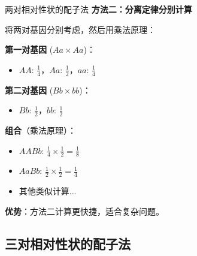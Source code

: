 \documentclass[a4paper,11pt]{ctexart}
\begin{document}
\begin{examplebox}{两对相对性状的配子法}
\textbf{方法二：分离定律分别计算}

将两对基因分别考虑，然后用乘法原理：

\textbf{第一对基因} ($Aa \times Aa$)：
\begin{itemize}[leftmargin=2em]
    \item $AA$: $\frac{1}{4}$，$Aa$: $\frac{1}{2}$，$aa$: $\frac{1}{4}$
\end{itemize}

\textbf{第二对基因} ($Bb \times bb$)：
\begin{itemize}[leftmargin=2em]
    \item $Bb$: $\frac{1}{2}$，$bb$: $\frac{1}{2}$
\end{itemize}

\textbf{组合}（乘法原理）：
\begin{itemize}[leftmargin=2em]
    \item $AABb$: $\frac{1}{4} \times \frac{1}{2} = \frac{1}{8}$
    \item $AaBb$: $\frac{1}{2} \times \frac{1}{2} = \frac{1}{4}$
    \item 其他类似计算...
\end{itemize}

\textbf{优势}：方法二计算更快捷，适合复杂问题。
\end{examplebox}

\subsection{三对相对性状的配子法}
\end{document}

